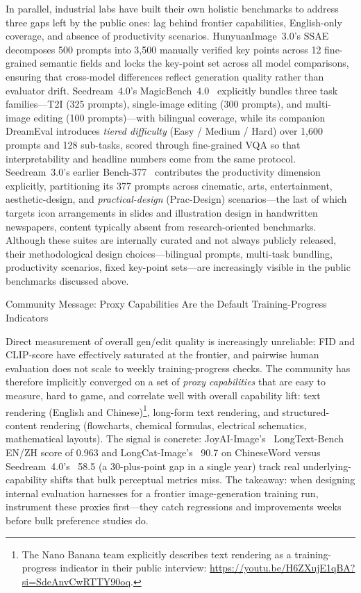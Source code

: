 In parallel, industrial labs have built their own holistic benchmarks to address three gaps left by the public ones: lag behind frontier capabilities, English-only coverage, and absence of productivity scenarios. HunyuanImage~3.0's SSAE~\citep{cao2025hunyuanimage} decomposes 500 prompts into 3{,}500 manually verified key points across 12 fine-grained semantic fields and locks the key-point set across all model comparisons, ensuring that cross-model differences reflect generation quality rather than evaluator drift. Seedream~4.0's MagicBench~4.0~\citep{seedream2025seedream} explicitly bundles three task families---T2I (325 prompts), single-image editing (300 prompts), and multi-image editing (100 prompts)---with bilingual coverage, while its companion DreamEval introduces \emph{tiered difficulty} (Easy / Medium / Hard) over 1{,}600 prompts and 128 sub-tasks, scored through fine-grained VQA so that interpretability and headline numbers come from the same protocol. Seedream~3.0's earlier Bench-377~\citep{gao2025seedream} contributes the productivity dimension explicitly, partitioning its 377 prompts across cinematic, arts, entertainment, aesthetic-design, and \emph{practical-design} (Prac-Design) scenarios---the last of which targets icon arrangements in slides and illustration design in handwritten newspapers, content typically absent from research-oriented benchmarks. Although these suites are internally curated and not always publicly released, their methodological design choices---bilingual prompts, multi-task bundling, productivity scenarios, fixed key-point sets---are increasingly visible in the public benchmarks discussed above.

\begin{highlightbox}{Community Message: Proxy Capabilities Are the Default Training-Progress Indicators}

Direct measurement of overall gen/edit quality is increasingly unreliable: FID and CLIP-score have effectively saturated at the frontier, and pairwise human evaluation does not scale to weekly training-progress checks. The community has therefore implicitly converged on a set of \emph{proxy capabilities} that are easy to measure, hard to game, and correlate well with overall capability lift: text rendering (English and Chinese)\footnote{The Nano Banana team explicitly describes text rendering as a training-progress indicator in their public interview: \url{https://youtu.be/H6ZXujE1qBA?si=SdeAnvCwRTTY90oq}.}, long-form text rendering, and structured-content rendering (flowcharts, chemical formulas, electrical schematics, mathematical layouts). The signal is concrete: JoyAI-Image's~\citep{jdjoyaiimage} LongText-Bench EN/ZH score of 0.963 and LongCat-Image's~\citep{team2025longcat} 90.7 on ChineseWord versus Seedream~4.0's~\citep{seedream2025seedream} 58.5 (a 30-plus-point gap in a single year) track real underlying-capability shifts that bulk perceptual metrics miss. The takeaway: when designing internal evaluation harnesses for a frontier image-generation training run, instrument these proxies first---they catch regressions and improvements weeks before bulk preference studies do.
\end{highlightbox}


